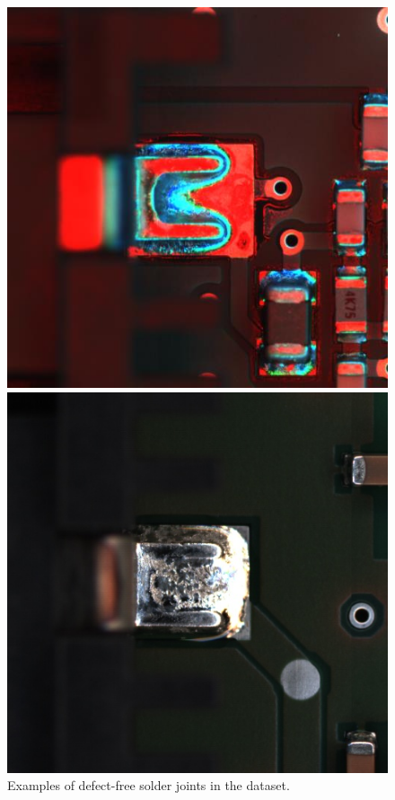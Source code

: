 \begin{figure}[ht!]
    \centering
    \begin{minipage}{0.32\textwidth}
        \centering
        \includegraphics[width=\textwidth]{Images/Val_FC_heat_BF2003054784_4796_144_2042_2042_Multi.jpg} %
    \end{minipage}   
    \begin{minipage}{0.32\textwidth}
        \centering
        \includegraphics[width=\textwidth]{Images/train_FC_BF2003015014_1174_42_2038_2038_Color.jpg} %
    \end{minipage}\hfill
    \caption{Examples of defect-free solder joints in the dataset.}
    \label{fig:dataset-FC}
\end{figure}

